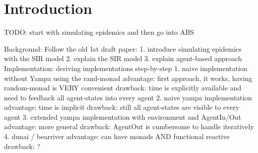 \section{Introduction}
TODO: start with simulating epidemics and then go into ABS

Background: Follow the old 1st draft paper:
1. introduce simulating epidemics with the SIR model
2. explain the SIR model 
3. explain agent-based approach 
Implementation: deriving implementations step-by-step 
1. naive implementation without Yampa using the rand-monad 
	advantage: 	first approach, it works, having random-monad is VERY convenient
	drawback: 	time is explicitly available and need to feedback all agent-states into every agent
2. naive yampa implementation
	advantage:	time is implicit
	drawback:	still all agent-states are visible to every agent
3. extended yampa implementation with environment and AgentIn/Out
	advantage:	more general
	drawback:	AgentOut is cumbersome to handle iteratively
4. dunai / bearriver
	advantage:	can have monads AND functional reactive 
	drawback:	?